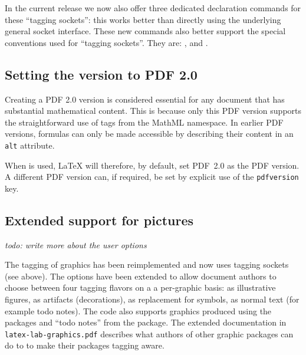 \documentclass{ltnews}
\begin{document}
In the current release we now also offer three dedicated declaration
commands for these \enquote{tagging sockets}: this works better than 
directly using the underlying general socket interface. 
These new commands also better support the
special conventions used for \enquote{tagging sockets}. They are:  
,  and
.


\subsection{Setting the version to PDF 2.0}

Creating a PDF 2.0 version is considered essential for any document that has 
substantial mathematical content.  This is because only this PDF version supports 
the straightforward use of tags from the 
MathML namespace.
%
In earlier PDF versions, formulas can only be made accessible by describing their content in an \texttt{alt} attribute.
%

When  is used, \LaTeX{}
will therefore, by default, set PDF~2.0 as the PDF version.
A different PDF version can, if required, be set by explicit use of 
the \texttt{pdfversion} key.


\subsection{Extended support for pictures}

\emph{todo: write more about the user options}

The tagging of graphics has been reimplemented and now uses
tagging sockets (see above). 
The options have been extended to allow document authors to choose between four
tagging flavors on a a per-graphic basis: 
as illustrative figures, as artifacts (decorations), as replacement for symbols, 
as normal text (for example todo notes).
The code also supports 
graphics produced using the 
 packages and \enquote{todo notes} from the  package.
The extended documentation in \texttt{latex-lab-graphics.pdf} describes what authors 
of other graphic packages can do to 
to make their packages tagging aware.
\end{document}
